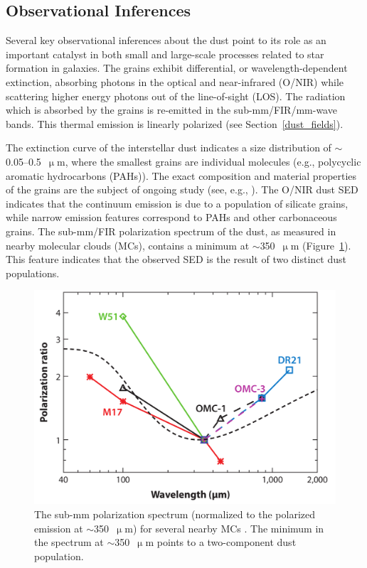 \subsection{Observational Inferences}

Several key observational inferences about the dust point to its role as an important catalyst in both small and large-scale processes related to star formation in galaxies. The grains exhibit differential, or wavelength-dependent extinction, absorbing photons in the optical and near-infrared (O/NIR) while scattering higher energy photons out of the line-of-sight (LOS). The radiation which is absorbed by the grains is re-emitted in the sub-mm/FIR/mm-wave bands. This thermal emission is linearly polarized (see Section~\ref{dust_fields}).

The extinction curve of the interstellar dust indicates a size distribution of $\sim$0.05--0.5~$\upmu$m, where the smallest grains are individual molecules (e.g., polycyclic aromatic hydrocarbons (PAHs)). The exact composition and material properties of the grains are the subject of ongoing study (see, e.g., \citet{andersson2015interstellar,draine2003interstellar}). The O/NIR dust SED indicates that the continuum emission is due to a population of silicate grains, while narrow emission features correspond to PAHs and other carbonaceous grains. The sub-mm/FIR polarization spectrum of the dust, as measured in nearby molecular clouds (MCs), contains a minimum at $\sim$350~$\upmu$m (Figure~\ref{fig:polspec}). This feature indicates that the observed SED is the result of two distinct dust populations.

\begin{figure}[!htbp]
\centering
\includegraphics[width=\textwidth]{figures/intro/polspec}
\caption[The measured polarization spectrum of interstellar dust in several nearby MCs.]{The sub-mm polarization spectrum (normalized to the polarized emission at $\sim$350~$\upmu$m) for several nearby MCs \citep{andersson2015interstellar}. The minimum in the spectrum at $\sim$350~$\upmu$m points to a two-component dust population.}
\label{fig:polspec}
\end{figure}


